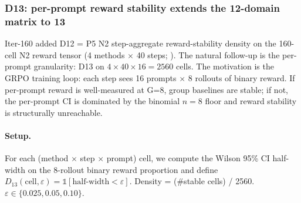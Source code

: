 
\subsubsection{D13: per-prompt reward stability extends the 12-domain matrix to 13}
\label{sec:synth-iter164-d13}

Iter-160 added D12 = P5 N2 step-aggregate reward-stability density on
the 160-cell N2 reward tensor (4 methods $\times$ 40 steps;
). The natural follow-up is the per-prompt
granularity: D13 on $4 \times 40 \times 16 = 2560$ cells. The motivation
is the GRPO training loop: each step sees 16 prompts $\times$ 8 rollouts
of binary reward. If per-prompt reward is well-measured at G=8, group
baselines are stable; if not, the per-prompt CI is dominated by the
binomial $n=8$ floor and reward stability is structurally unreachable.

\paragraph{Setup.}
For each (method $\times$ step $\times$ prompt) cell, we compute the
Wilson 95\% CI half-width on the 8-rollout binary reward proportion
and define $D_{13}(\mathrm{cell}, \varepsilon) = \mathbb{1}[\mathrm{half\text{-}width} < \varepsilon]$.
Density = (\#stable cells) / 2560.
$\varepsilon \in \{0.025, 0.05, 0.10\}$.

